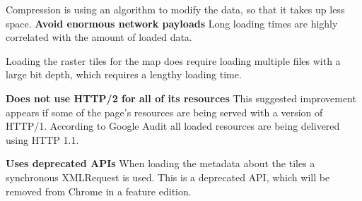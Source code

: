 Compression is using an algorithm to modify the data, so that it takes up less space.
\citep{MinifyJS}
\textbf{Avoid enormous network payloads}
Long loading times are highly correlated with the amount of loaded data.  
\citep{LoadingTooMuch}

Loading the raster tiles for the map does require loading multiple files with a large bit depth, which requires a lengthy loading time. 

\textbf{Does not use HTTP/2 for all of its resources}
This suggested improvement appears if some of the page’s resources are being served with a version of HTTP/1. According to Google Audit all loaded resources are being delivered using HTTP 1.1.


\citep{HTTP2}

\textbf{Uses deprecated APIs}
When loading the metadata about the tiles a synchronous XMLRequest is used. This is a deprecated API, which will be removed from Chrome in a feature edition. 
\citep{OldApis}
